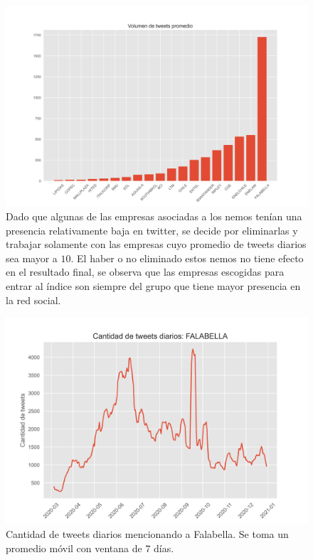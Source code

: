 \documentclass{article}
\begin{document}
\begin{figure}[H]
	\centering
	\includegraphics[scale=.38]{imgs/volume_tweets_agg.png}
	\caption{
	Dado que algunas de las empresas asociadas a los nemos tenían una presencia relativamente baja en twitter, se decide por eliminarlas y trabajar solamente con las empresas cuyo promedio de tweets diarios sea mayor a $10$. El haber o no eliminado estos nemos no tiene efecto en el resultado final, se observa que las empresas escogidas para entrar al índice son siempre del grupo que tiene mayor presencia en la red social.}
	\label{fig:volume_tweets_agg}
\end{figure}
\begin{figure}[H]
	\centering
	\includegraphics[scale=.55]{imgs/falabella_volume.png}
	\caption{Cantidad de tweets diarios mencionando a Falabella. Se toma un promedio móvil con ventana de $7$ días.}
	\label{fig:falabella_volume}
\end{figure}
\end{document}

